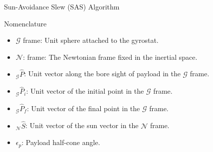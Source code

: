 \documentclass{beamer}
\begin{document}
\begin{frame}{Sun-Avoidance Slew (SAS) Algorithm}
\begin{block}{Nomenclature}
\begin{itemize}
\item $\mathcal{G}$ frame: Unit sphere attached to the gyrostat.
\item $\mathcal{N}$: frame: The Newtonian frame fixed in the inertial space.
\item $_\mathcal{G}\hat{P}$: Unit vector along the bore sight of payload in the $\mathcal{G}$ frame.
\item $_\mathcal{G}\hat{P}_i$: Unit vector of the initial point in the $\mathcal{G}$ frame.
\item $_\mathcal{G}\hat{P}_f$: Unit vector of the final point in the $\mathcal{G}$ frame.
\item $_\mathcal{N}\hat{S}$: Unit vector of the sun vector in the $\mathcal{N}$ frame.
 \item $\epsilon_p$: Payload half-cone angle.
\end{itemize}
\end{block}
\end{frame}
%
%
%
\end{document}
